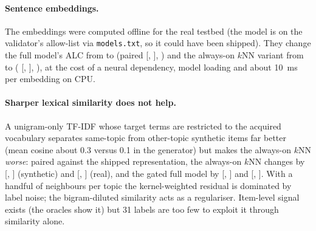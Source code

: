 \documentclass{article}
\begin{document}
\paragraph{Sentence embeddings.}
The embeddings were computed offline for the real testbed (the model is on the validator's allow-list via \texttt{models.txt}, so it could have been shipped). They change the full model's ALC from \REmbTfidfFullAlc{} to \REmbMinilmFullAlc{} (paired \REmbPairFullMean{} [\REmbPairFullLo, \REmbPairFullHi], \REmbPairFullSig) and the always-on $k$NN variant from \REmbTfidfKnnAlc{} to \REmbMinilmKnnAlc{} (\REmbPairKnnMean{} [\REmbPairKnnLo, \REmbPairKnnHi], \REmbPairKnnSig), at the cost of a neural dependency, model loading and about 10~ms per embedding on CPU.

\paragraph{Sharper lexical similarity does not help.}
A unigram-only TF-IDF whose target terms are restricted to the acquired vocabulary separates same-topic from other-topic synthetic items far better (mean cosine about 0.3 versus 0.1 in the generator) but makes the always-on $k$NN \emph{worse}: paired against the shipped representation, the always-on $k$NN changes by \STfidfUniKnnVsShippedMean{} [\STfidfUniKnnVsShippedLo, \STfidfUniKnnVsShippedHi] (synthetic) and \RTfidfUniKnnVsShippedMean{} [\RTfidfUniKnnVsShippedLo, \RTfidfUniKnnVsShippedHi] (real), and the gated full model by \STfidfUniFullVsShippedMean{} [\STfidfUniFullVsShippedLo, \STfidfUniFullVsShippedHi] and \RTfidfUniFullVsShippedMean{} [\RTfidfUniFullVsShippedLo, \RTfidfUniFullVsShippedHi]. With a handful of neighbours per topic the kernel-weighted residual is dominated by label noise; the bigram-diluted similarity acts as a regulariser. Item-level signal exists (the oracles show it) but 31 labels are too few to exploit it through similarity alone.
\end{document}

